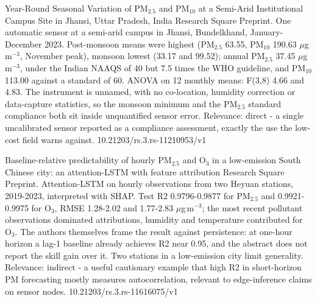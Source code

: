 \documentclass[10pt]{article}
\begin{document}
\par{}\baselineskip{}\baselineskip
{}

{Year-Round Seasonal Variation of PM$_{2.5}$ and PM$_{10}$ at a Semi-Arid Institutional Campus Site in Jhansi, Uttar Pradesh, India}
{Research Square}
{Preprint. One automatic sensor at a semi-arid campus in Jhansi, Bundelkhand, January-December 2023. Post-monsoon means were highest (PM$_{2.5}$ 63.55, PM$_{10}$ 190.63 $\mu$g\,m$^{-3}$, November peak), monsoon lowest (33.17 and 99.52); annual PM$_{2.5}$ 37.45 $\mu$g\,m$^{-3}$, under the Indian NAAQS of 40 but 7.5 times the WHO guideline, and PM$_{10}$ 113.00 against a standard of 60. ANOVA on 12 monthly means: F(3,8) 4.66 and 4.83. The instrument is unnamed, with no co-location, humidity correction or data-capture statistics, so the monsoon minimum and the PM$_{2.5}$ standard compliance both sit inside unquantified sensor error. Relevance: direct - a single uncalibrated sensor reported as a compliance assessment, exactly the use the low-cost field warns against.}
{10.21203/rs.3.rs-11210953/v1}

{Baseline-relative predictability of hourly PM$_{2.5}$ and O$_3$ in a low-emission South Chinese city: an attention-LSTM with feature attribution}
{Research Square}
{Preprint. Attention-LSTM on hourly observations from two Heyuan stations, 2019-2023, interpreted with SHAP. Test R2 0.9796-0.9877 for PM$_{2.5}$ and 0.9921-0.9975 for O$_3$, RMSE 1.28-2.02 and 1.77-2.83 $\mu$g\,m$^{-3}$; the most recent pollutant observations dominated attributions, humidity and temperature contributed for O$_3$. The authors themselves frame the result against persistence: at one-hour horizon a lag-1 baseline already achieves R2 near 0.95, and the abstract does not report the skill gain over it. Two stations in a low-emission city limit generality. Relevance: indirect - a useful cautionary example that high R2 in short-horizon PM forecasting mostly measures autocorrelation, relevant to edge-inference claims on sensor nodes.}
{10.21203/rs.3.rs-11616075/v1}

\par{}\baselineskip{}\baselineskip
{}
\end{document}
